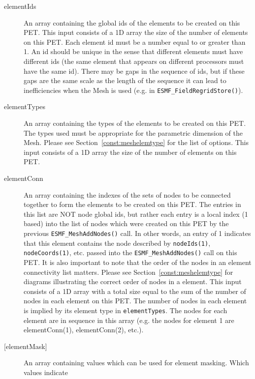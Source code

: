      \begin{description}
     \item [elementIds]
            An array containing the global ids of the elements to be created on this PET.
            This input consists of a 1D array the size of the number of elements on this PET.
            Each element id must be a number equal to or greater than 1. An id should be
            unique in the sense that different elements must have different ids (the same element
            that appears on different processors must have the same id). There may be gaps in the sequence
            of ids, but if these gaps are the same scale as the length of the sequence it can lead to
            inefficiencies when the Mesh is used (e.g. in {\tt ESMF\_FieldRegridStore()}).
     \item[elementTypes]
            An array containing the types of the elements to be created on this PET. The types used
            must be appropriate for the parametric dimension of the Mesh. Please see
            Section~\ref{const:meshelemtype} for the list of options. This input consists of
            a 1D array the size of the number of elements on this PET.
     \item[elementConn]
           An array containing the indexes of the sets of nodes to be connected together to form the
           elements to be created on this PET. The entries in this list are NOT node global ids,
           but rather each entry is a local index (1 based) into the list of nodes which were
           created on this PET by the previous {\tt ESMF\_MeshAddNodes()} call.
           In other words, an entry of 1 indicates that this element contains the node
           described by {\tt nodeIds(1)}, {\tt nodeCoords(1)}, etc. passed into the
           {\tt ESMF\_MeshAddNodes()} call on this PET. It is also
           important to note that the order of the nodes in an element connectivity list
           matters. Please see Section~\ref{const:meshelemtype} for diagrams illustrating
           the correct order of nodes in a element. This input consists of a 1D array with
           a total size equal to the sum of the number of nodes in each element on
           this PET. The number of nodes in each element is implied by its element type in
           {\tt elementTypes}. The nodes for each element
           are in sequence in this array (e.g. the nodes for element 1 are elementConn(1),
           elementConn(2), etc.).
     \item [{[elementMask]}]
            An array containing values which can be used for element masking. Which values indicate

\end{description}
